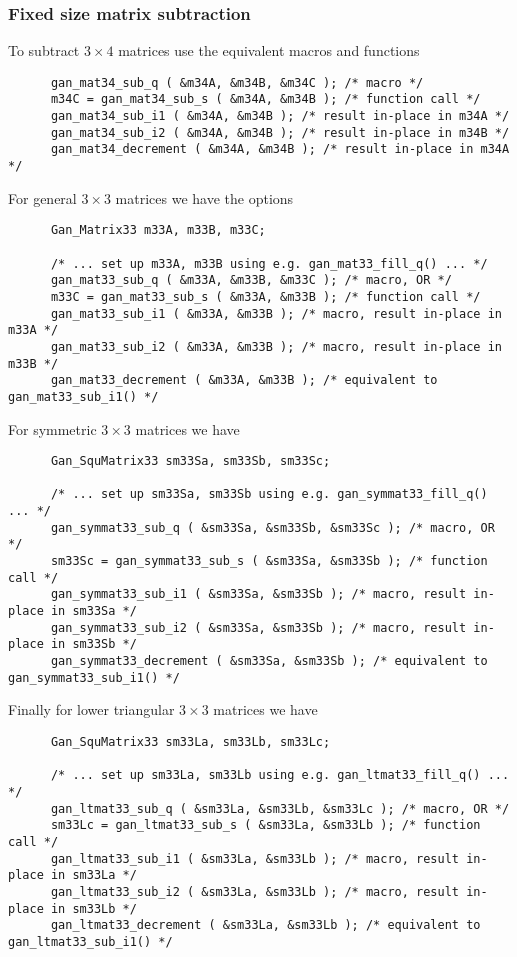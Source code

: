 \subsubsection{Fixed size matrix subtraction}
To subtract $3\times4$ matrices use the equivalent macros and functions
\begin{verbatim}
      gan_mat34_sub_q ( &m34A, &m34B, &m34C ); /* macro */
      m34C = gan_mat34_sub_s ( &m34A, &m34B ); /* function call */
      gan_mat34_sub_i1 ( &m34A, &m34B ); /* result in-place in m34A */
      gan_mat34_sub_i2 ( &m34A, &m34B ); /* result in-place in m34B */
      gan_mat34_decrement ( &m34A, &m34B ); /* result in-place in m34A */
\end{verbatim}
For general $3\times 3$ matrices we have the options
\begin{verbatim}
      Gan_Matrix33 m33A, m33B, m33C;

      /* ... set up m33A, m33B using e.g. gan_mat33_fill_q() ... */
      gan_mat33_sub_q ( &m33A, &m33B, &m33C ); /* macro, OR */
      m33C = gan_mat33_sub_s ( &m33A, &m33B ); /* function call */
      gan_mat33_sub_i1 ( &m33A, &m33B ); /* macro, result in-place in m33A */
      gan_mat33_sub_i2 ( &m33A, &m33B ); /* macro, result in-place in m33B */
      gan_mat33_decrement ( &m33A, &m33B ); /* equivalent to gan_mat33_sub_i1() */
\end{verbatim}
For symmetric $3\times 3$ matrices we have
\begin{verbatim}
      Gan_SquMatrix33 sm33Sa, sm33Sb, sm33Sc;

      /* ... set up sm33Sa, sm33Sb using e.g. gan_symmat33_fill_q() ... */
      gan_symmat33_sub_q ( &sm33Sa, &sm33Sb, &sm33Sc ); /* macro, OR */
      sm33Sc = gan_symmat33_sub_s ( &sm33Sa, &sm33Sb ); /* function call */
      gan_symmat33_sub_i1 ( &sm33Sa, &sm33Sb ); /* macro, result in-place in sm33Sa */
      gan_symmat33_sub_i2 ( &sm33Sa, &sm33Sb ); /* macro, result in-place in sm33Sb */
      gan_symmat33_decrement ( &sm33Sa, &sm33Sb ); /* equivalent to gan_symmat33_sub_i1() */
\end{verbatim}
Finally for lower triangular $3\times 3$ matrices we have
\begin{verbatim}
      Gan_SquMatrix33 sm33La, sm33Lb, sm33Lc;

      /* ... set up sm33La, sm33Lb using e.g. gan_ltmat33_fill_q() ... */
      gan_ltmat33_sub_q ( &sm33La, &sm33Lb, &sm33Lc ); /* macro, OR */
      sm33Lc = gan_ltmat33_sub_s ( &sm33La, &sm33Lb ); /* function call */
      gan_ltmat33_sub_i1 ( &sm33La, &sm33Lb ); /* macro, result in-place in sm33La */
      gan_ltmat33_sub_i2 ( &sm33La, &sm33Lb ); /* macro, result in-place in sm33Lb */
      gan_ltmat33_decrement ( &sm33La, &sm33Lb ); /* equivalent to gan_ltmat33_sub_i1() */
\end{verbatim}


